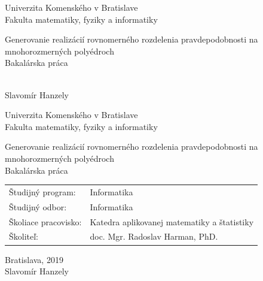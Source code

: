 \documentclass[12pt, twoside]{book}
\def\mfrok{2019}
\def\mfnazov{Generovanie realizácií rovnomerného rozdelenia pravdepodobnosti
	na mnohorozmerných polyédroch}
\def\mftyp{Bakalárska práca}
\def\mfautor{Slavomír Hanzely}
\def\mfskolitel{doc. Mgr. Radoslav Harman, PhD.}
\def\mfkonzultant{tit. Meno Priezvisko, tit. }
\def\mfmiesto{Bratislava, \mfrok}
\def\mfodbor{ Informatika}
\def\program{ Informatika }
\def\mfpracovisko{ Katedra aplikovanej matematiky a štatistiky }
\begin{document}
     
\frontmatter


\thispagestyle{empty}

\begin{center}
\sc\large
Univerzita Komenského v Bratislave\\
Fakulta matematiky, fyziky a informatiky

\vfill

{\LARGE\mfnazov}\\
\mftyp
\end{center}

\vfill

{\sc\large 
\noindent \mfrok\\
\mfautor
}

\cleardoublepage


\thispagestyle{empty}
\noindent

\begin{center}
\sc  
\large
Univerzita Komenského v Bratislave\\
Fakulta matematiky, fyziky a informatiky

\vfill

{\LARGE\mfnazov}\\
\mftyp
\end{center}

\vfill

\noindent
\begin{tabular}{ll}
Študijný program: & \program \\
Študijný odbor: & \mfodbor \\
Školiace pracovisko: & \mfpracovisko \\
Školiteľ: & \mfskolitel \\
\end{tabular}

\vfill


\noindent \mfmiesto\\
\mfautor

\cleardoublepage


\end{document}
